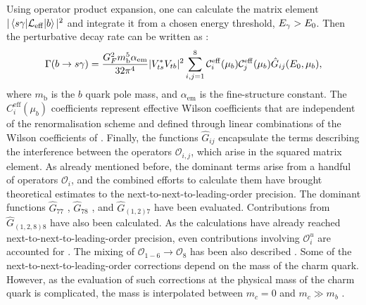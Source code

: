Using operator product expansion, one can calculate the matrix element $|\mel*{s\gamma}{\mathcal{L}_{\mathrm{eff}}}{b}|^2$ and integrate it from a chosen energy threshold, ${E_{\gamma}}>E_0$. 
Then the perturbative decay rate can be written as \cite{Misiak:2020vlo}:
\begin{equation}\label{eq:theory_decay_rate}
    \Gamma(b\rightarrow s\gamma) = \frac{G^2_F m_{\mathrm{b}}^5 \alpha_{\mathrm{em}}}{32\pi^4}|V_{ts}^*V_{tb}|^2\sum_{i,j=1}^8\mathcal{C}^{\mathrm{eff}}_{i}(\mu_b)\mathcal{C}^{\mathrm{eff}}_{j}(\mu_b)\hat{G}_{ij}(E_0,\mu_b),
\end{equation}
where $m_{\mathrm{b}}$ is the $b$ quark pole mass, and $\alpha_{\mathrm{em}}$ is the fine-structure constant.
The $C_{i}^{\mathrm{eff}}(\mu_b)$ coefficients represent effective Wilson coefficients \cite{Buras:1993xp} that are independent of the renormalisation scheme and defined through linear combinations of the Wilson coefficients of .
Finally, the functions $\hat{G}_{ij}$ encapsulate the terms describing the interference between the operators $\mathcal{O}_{i,j}$, which arise in the squared matrix element.
As already mentioned before, the dominant terms arise from a handful of operators $\mathcal{O}_i$, and the combined efforts to calculate them have brought \BtoXsgamma theoretical estimates to the next-to-next-to-leading-order precision.
The dominant functions $\hat{G}_{77}$ \cite{Asatrian:2006rq}, $\hat{G}_{78}$ \cite{Asatrian:2010rq}, and $\hat{G}_{(1,2)7}$ \cite{Boughezal:2007ny,Misiak:2020vlo} have been evaluated.
Contributions from $\hat{G}_{(1,2,8)8}$ \cite{Ferroglia:2010xe,Misiak:2010tk} have also been calculated.
As the calculations have already reached next-to-next-to-leading-order precision, even contributions involving $\mathcal{O}_{i}^u$ are accounted for \cite{Huber:2014nna}.
The mixing of $\mathcal{O}_{1-6}\to\mathcal{O}_8$ has been also described \cite{Czakon:2006ss}. 
Some of the next-to-next-to-leading-order corrections depend on the mass of the charm quark.
However, as the evaluation of such corrections at the physical mass of the charm quark is complicated, the mass is interpolated between $m_c=0$ and $m_c\gg m_b$ \cite{Misiak:2019ccp}.

